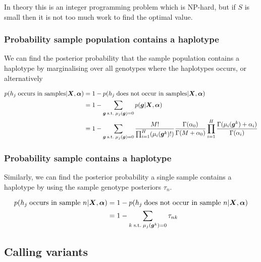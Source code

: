 \documentclass{article}
\begin{document}
In theory this is an integer programming problem which is NP-hard, but if $S$ is small then it is not too much work to find the optimal value.

\subsubsection{Probability sample population contains a haplotype}

We can find the posterior probability that the sample population contains a haplotype by marginalising over all genotypes where the haplotypes occurs, or alternatively 

\begin{align}
\label{eq:sph_pp}
     p(h_j \; \text{occurs in samples}| \boldsymbol{X}, \boldsymbol{\alpha}) &= 1 - p(h_j \; \text{does not occur in samples}| \boldsymbol{X}, \boldsymbol{\alpha}) \notag \\
     &= 1 - \sum_{\boldsymbol{g} \; \text{s.t.} \; \mu_j(\boldsymbol{g}) = 0} p(\boldsymbol{g} | \boldsymbol{X}, \boldsymbol{\alpha}) \notag \\
     &= 1 -  \sum_{\boldsymbol{g} \; \text{s.t.} \; \mu_j(\boldsymbol{g}) = 0} \frac{M!}{\prod_{i = 1}^{H} (\mu_i(\boldsymbol{g}^k)!)} \frac{\Gamma(\alpha_0)}{\Gamma(M + \alpha_0)} \prod_{i = 1}^H \frac{\Gamma(\mu_i(\boldsymbol{g}^k) + \alpha_i)}{\Gamma(\alpha_i)}
\end{align}

\subsubsection{Probability sample contains a haplotype}

Similarly, we can find the posterior probability a single sample contains a haplotype by using the sample genotype posteriors $\tau_{n}$.

\begin{align}
\label{eq:sh_pp}
p(h_j \; \text{occurs in sample } n | \boldsymbol{X}, \boldsymbol{\alpha}) &= 1 - p(h_j \; \text{does not occur in sample } n | \boldsymbol{X}, \boldsymbol{\alpha}) \notag \\
    &= 1 - \sum_{k \; \text{s.t.} \; \mu_j(\boldsymbol{g}^k) = 0} \tau_{nk}
\end{align}

\subsection{Calling variants}
\end{document}
